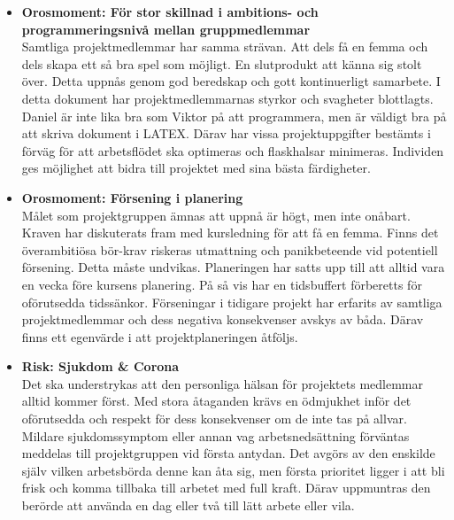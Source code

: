 \documentclass{mall}
\begin{document}
\begin{itemize}

\item \textbf{Orosmoment: För stor skillnad i ambitions- och programmeringsnivå mellan gruppmedlemmar}\\
Samtliga projektmedlemmar har samma strävan. Att dels få en femma och dels skapa ett så bra spel som möjligt. En slutprodukt att känna sig stolt över. Detta uppnås genom god beredskap och gott kontinuerligt samarbete. I detta dokument har projektmedlemmarnas styrkor och svagheter blottlagts. Daniel är inte lika bra som Viktor på att programmera, men är väldigt bra på att skriva dokument i LATEX. Därav har vissa projektuppgifter bestämts i förväg för att arbetsflödet ska optimeras och flaskhalsar minimeras. Individen ges möjlighet att bidra till projektet med sina bästa färdigheter. 


\item \textbf{Orosmoment: Försening i planering}\\
  Målet som projektgruppen ämnas att uppnå är högt, men inte onåbart. Kraven har diskuterats fram med kursledning för att få en femma. Finns det överambitiösa bör-krav riskeras utmattning och panikbeteende vid potentiell försening. Detta måste undvikas. Planeringen har satts upp till att alltid vara en vecka före kursens planering. På så vis har en tidsbuffert förberetts för oförutsedda tidssänkor. Förseningar i tidigare projekt har erfarits av samtliga projektmedlemmar och dess negativa konsekvenser avskys av båda. Därav finns ett egenvärde i att projektplaneringen åtföljs.


\item \textbf{Risk: Sjukdom \& Corona}\\
  Det ska understrykas att den personliga hälsan för projektets medlemmar alltid kommer först. Med stora åtaganden krävs en ödmjukhet inför det oförutsedda och respekt för dess konsekvenser om de inte tas på allvar. Mildare sjukdomssymptom eller annan vag arbetsnedsättning förväntas meddelas till projektgruppen vid första antydan. Det avgörs av den enskilde själv vilken arbetsbörda denne kan åta sig, men första prioritet ligger i att bli frisk och komma tillbaka till arbetet med full kraft. Därav uppmuntras den berörde att använda en dag eller två till lätt arbete eller vila.


\end{itemize}
\end{document}

